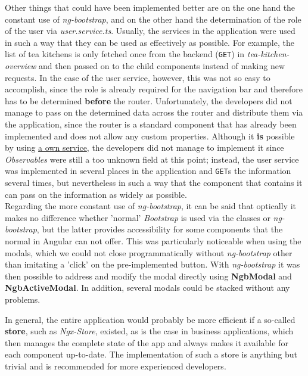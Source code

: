 Other things that could have been implemented better are on the one hand the constant use of \textit{ng-bootstrap}, and on the other hand the determination of the role of the user via \textit{user.service.ts}. Usually, the services in the application were used in such a way that they can be used as effectively as possible. For example, the list of tea kitchens is only fetched once from the backend (\texttt{GET}) in \textit{tea-kitchen-overview} and then passed on to the child components instead of making new requests. In the case of the user service, however, this was not so easy to accomplish, since the role is already required for the navigation bar and therefore has to be determined \textbf{before} the router. Unfortunately, the developers did not manage to pass on the determined data across the router and distribute them via the application, since the router is a standard component that has already been implemented and does not allow any custom properties. Although it \textbf{is} possible by using \href{https://stackoverflow.com/questions/41451375/passing-data-into-router-outlet-child-components}{a own service}, the developers did not manage to implement it since \textit{Observables} were still a too unknown field at this point; instead, the user service was implemented in several places in the application and \texttt{GET}s the information several times, but nevertheless in such a way that the component that contains it can pass on the information as widely as possible. \\
Regarding the more constant use of \textit{ng-bootstrap}, it can be said that optically it makes no difference whether 'normal' \textit{Bootstrap} is used via the classes or \textit{ng-bootstrap}, but the latter provides accessibility for some components that the normal in Angular can not offer. This was particularly noticeable when using the modals, which we could not close programmatically without \textit{ng-bootstrap} other than imitating a 'click' on the pre-implemented button. With \textit{ng-bootstrap} it was then possible to address and modify the modal directly using \textbf{NgbModal} and \textbf{NgbActiveModal}. In addition, several modals could be stacked without any problems.

In general, the entire application would probably be more efficient if a so-called \textbf{store}, such as \textit{Ngx-Store}, existed, as is the case in business applications, which then manages the complete state of the app and always makes it available for each component up-to-date. The implementation of such a store is anything but trivial and is recommended for more experienced developers.

